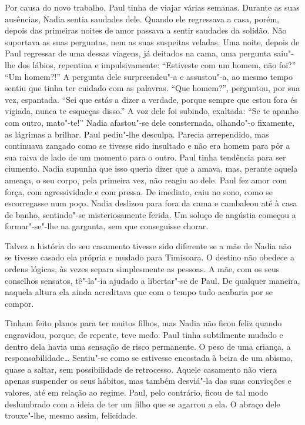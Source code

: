 Por causa do novo trabalho, Paul tinha de viajar várias semanas. Durante
as suas ausências, Nadia sentia saudades dele. Quando ele regressava a
casa, porém, depois das primeiras noites de amor passava a sentir
saudades da solidão. Não suportava as suas perguntas, nem as suas
suspeitas veladas. Uma noite, depois de Paul regressar de
uma dessas viagens, já deitados na cama, uma pergunta saiu"-lhe dos
lábios, repentina e impulsivamente: ``Estiveste com um homem, não foi?''
``Um homem?!'' A pergunta dele surpreendeu"-a e assustou"-a, ao mesmo tempo
sentiu que tinha ter cuidado com as palavras. ``Que homem?'', perguntou,
por sua vez, espantada. ``Sei que estás a dizer a verdade, porque sempre
que estou fora és vigiada, nunca te esqueças disso.'' A voz dele foi
subindo, exaltada: ``Se te apanho com outro, mato"-te!'' Nadia afastou"-se
dele consternada, olhando"-o fixamente, as lágrimas a brilhar. Paul
pediu"-lhe desculpa. Parecia arrependido, mas continuava zangado como se
tivesse sido insultado e não era homem para pôr a sua raiva de lado de
um momento para o outro. Paul tinha tendência para ser ciumento. Nadia
supunha que isso queria dizer que a amava, mas, perante aquela ameaça, o
seu corpo, pela primeira vez, não reagiu ao dele. Paul fez amor com
força, com agressividade e com pressa. De imediato, caiu no sono, como
se escorregasse num poço. Nadia deslizou para fora da cama e cambaleou
até à casa de banho, sentindo"-se misteriosamente ferida. Um soluço de
angústia começou a formar"-se"-lhe na garganta,
sem que conseguisse chorar.

Talvez a história do seu casamento tivesse sido diferente se a mãe de
Nadia não se tivesse casado ela própria e mudado para Timisoara. O
destino não obedece a ordens lógicas, às vezes separa simplesmente as
pessoas. A mãe, com os seus conselhos sensatos, tê"-la"-ia ajudado a
libertar"-se de Paul. De qualquer maneira, naquela altura ela ainda acreditava
que com o tempo tudo acabaria por se compor.

Tinham feito planos para ter muitos filhos, mas Nadia não ficou feliz
quando engravidou, porque, de repente, teve medo. Paul tinha subtilmente
mudado e dentro dela havia uma sensação de risco permanente. O peso de
uma criança, a responsabilidade\ldots{} Sentiu"-se como se estivesse
encostada à beira de um abismo, quase a saltar, sem possibilidade de
retrocesso. Aquele casamento não viera apenas suspender os seus
hábitos, mas também desviá"-la das suas convicções e valores, até em
relação ao regime. Paul, pelo contrário, ficou de tal modo deslumbrado
com a ideia de ter um filho que se agarrou a ela. O abraço dele trouxe"-lhe, mesmo assim, felicidade.


